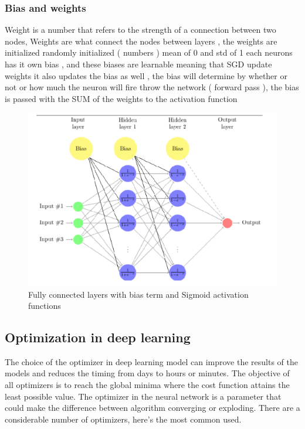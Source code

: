 \subsubsection{Bias and weights}
Weight is a number that refers to the strength of a connection between two nodes,
Weights are what connect the nodes between layers , the weights are initialized randomly
initialized ( numbers ) mean of 0 and std of 1 each neurons has it own bias , and these
biases are learnable meaning that SGD update weights it also updates the bias as well ,
the bias will determine by whether or not or how much the neuron will fire throw the
network ( forward pass ), the bias is passed with the SUM of the weights to the activation
function
\begin{figure}[!h]
    \centering
    \includegraphics[width=1\textwidth]{chapters/chapter02/fig02/ann.PNG}
    \caption{Fully connected layers with bias term and Sigmoid activation functions}
    \label{fig:my_label}
\end{figure}
\subsection{Optimization in deep learning}
The choice of the optimizer in deep learning model can improve the results of the
models and reduces the timing from days to hours or minutes. The objective of all
optimizers is to reach the global minima where the cost function attains the least
possible value. The optimizer in the neural network is a parameter that could make the
difference between algorithm converging or exploding. There are a considerable number
of optimizers, here’s the most common used.
